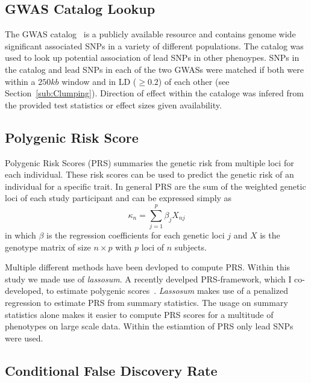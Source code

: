 \subsection{GWAS Catalog Lookup}
\label{sub:GWAS_Cataloge_Lookup}

The GWAS catalog~\cite{Welter2014} is a publicly available resource and contains genome wide significant associated SNPs in a variety of different populations.
The catalog was used to look up potential association of lead SNPs in other phenoypes.
SNPs in the catalog and lead SNPs in each of the two GWASs were matched if both were within a $250kb$ window and in LD ($\ge 0.2$) of each other (see Section~\ref{sub:Clumping}).
Direction of effect within the cataloge was infered from the provided test statistics or effect sizes given availability.

\subsection{Polygenic Risk Score}
\label{sub:prs}

Polygenic Risk Scores (PRS) summaries the genetic risk from multiple loci for each individual.
These risk scores can be used to predict the genetic risk of an individual for a specific trait.
In general PRS are the sum of the weighted genetic loci of each study participant and can be expressed simply as
\begin{equation}
	\kappa_n = \sum^p_{j=1} \beta_j X_{nj}
\end{equation}
in which $\beta$ is the regression coefficients for each genetic loci $j$ and $X$ is the genotype matrix of size  $n\times p$ with $p$ loci of $n$ subjects.

Multiple different methods have been devloped to compute PRS\@.
Within this study we made use of \textit{lassosum}.
A recently develped PRS-framework, which I co-developed, to estimate polygenic scores~\cite{Mak2016}.
\textit{Lassosum} makes use of a penalized regression to estimate PRS from summary statistics.
The usage on summary statistics alone makes it easier to compute PRS scores for a multitude of phenotypes on large scale data.
Within the estiamtion of PRS only lead SNPs were used.

\subsection{Conditional False Discovery Rate}
\label{sub:conditional_false_discovery_rate}

